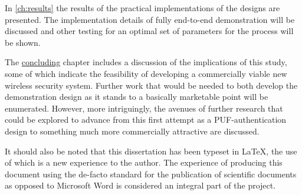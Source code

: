 In \autoref{ch:results} the results of the practical implementations of the designs
are presented. The implementation details of fully end-to-end demonstration will be
discussed and other testing for an optimal set of parameters for the process will be
shown.

The \hyperref[ch:conclusion]{concluding} chapter includes a
discussion of the implications
of this study, some of which indicate the feasibility of developing a commercially
viable new wireless security system. Further work
that would be needed to both develop the demonstration design as it stands to a
basically marketable point will be enumerated. However, more intriguingly, the avenues of
further research that could be explored to advance from this first attempt as a PUF-authentication
design to something much more commercially attractive are discussed.

It should also be noted that this dissertation has been typeset in \LaTeX, the
use of which is a new experience to the author. The experience of producing this
document using the de-facto standard for the publication of scientific documents
as opposed to Microsoft Word is considered an integral part of the project.
